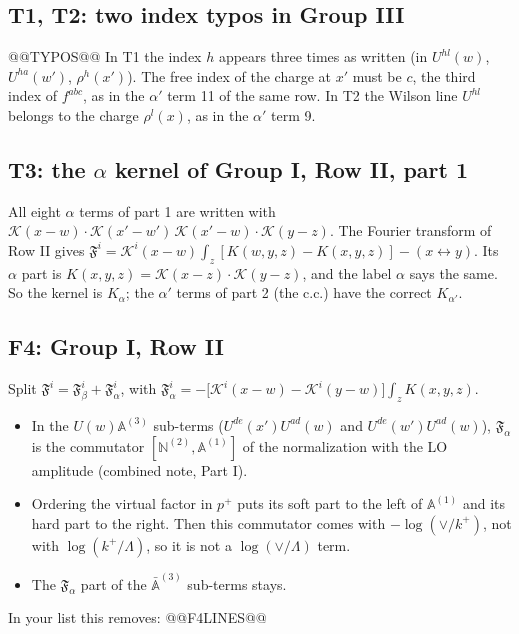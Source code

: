 \documentclass[10pt]{article}
\numberwithin{equation}{section}
\newcommand{\KK}{\mathcal K}
\begin{document}
\subsection{T1, T2: two index typos in Group III}
@@TYPOS@@
In T1 the index $h$ appears three times as written (in $U^{hl}(w)$, $U^{ha}(w')$, $\rho^h(x')$). The free index of the charge at $x'$ must be $c$, the third index of $f^{abc}$, as in the $\alpha'$ term 11 of the same row. In T2 the Wilson line $U^{hl}$ belongs to the charge $\rho^l(x)$, as in the $\alpha'$ term 9.

\subsection{T3: the \texorpdfstring{$\alpha$}{alpha} kernel of Group I, Row II, part 1}
All eight $\alpha$ terms of part 1 are written with $\KK(x-w)\cdot\KK(x'-w')\,\KK(x'-w)\cdot\KK(y-z)$. The Fourier transform of Row II gives $\mathfrak F^i=\KK^i(x-w)\int_z[K(w,y,z)-K(x,y,z)]-(x\leftrightarrow y)$. Its $\alpha$ part is $K(x,y,z)=\KK(x-z)\cdot\KK(y-z)$, and the label $\alpha$ says the same. So the kernel is $K_\alpha$; the $\alpha'$ terms of part 2 (the c.c.) have the correct $K_{\alpha'}$.

\subsection{F4: Group I, Row II}
Split $\mathfrak F^i=\mathfrak F^i_\beta+\mathfrak F^i_\alpha$, with $\mathfrak F^i_\alpha=-\big[\KK^i(x-w)-\KK^i(y-w)\big]\int_zK(x,y,z)$.
\begin{itemize}
\item In the $U(w)\mathbb A^{(3)}$ sub-terms ($U^{de}(x')U^{ad}(w)$ and $U^{de}(w')U^{ad}(w)$), $\mathfrak F_\alpha$ is the commutator $[\mathbb N^{(2)},\mathbb A^{(1)}]$ of the normalization with the LO amplitude (combined note, Part I).
\item Ordering the virtual factor in $p^+$ puts its soft part to the left of $\mathbb A^{(1)}$ and its hard part to the right. Then this commutator comes with $-\log(\vee/k^+)$, not with $\log(k^+/\Lambda)$, so it is not a $\log(\vee/\Lambda)$ term.
\item The $\mathfrak F_\alpha$ part of the $\bar{\mathbb A}^{(3)}$ sub-terms stays.
\end{itemize}
In your list this removes:
@@F4LINES@@
\end{document}
